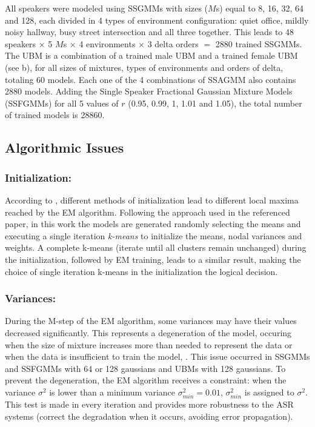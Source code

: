 All speakers were modeled using SSGMMs with sizes ($M$s) equal to 8, 16, 32, 64 and 128, each divided in 4 types of environment configuration: quiet office, mildly noisy hallway, busy street intersection and all three together. This leads to 48 speakers $\times$ 5 $M$s $\times$ 4 environments $\times$ 3 delta orders $=$ 2880 trained SSGMMs. The UBM is a combination of a trained male UBM and a trained female UBM (see b), for all sizes of mixtures, types of environments and orders of delta, totaling 60 models. Each one of the 4 combinations of SSAGMM also contains 2880 models. Adding the Single Speaker Fractional Gaussian Mixture Models (SSFGMMs) for all 5 values of $r$ (0.95, 0.99, 1, 1.01 and 1.05), the total number of trained models is 28860.

\subsection{Algorithmic Issues}

\subsubsection{Initialization:}

According to , different methods of initialization lead to different local maxima reached by the EM algorithm. Following the approach used in the referenced paper, in this work the models are generated randomly selecting the means and executing a single iteration \emph{k-means} to initialize the means, nodal variances and weights. A complete k-means (iterate until all clusters remain unchanged) during the initialization, followed by EM training, leads to a similar result, making the choice of single iteration k-means in the initialization the logical decision.

\subsubsection{Variances:}

During the M-step of the EM algorithm, some variances may have their values decreased significantly. This represents a degeneration of the model, occuring when the size of mixture increases more than needed to represent the data or when the data is insufficient to train the model, . This issue occurred in SSGMMs and SSFGMMs with 64 or 128 gaussians and UBMs with 128 gaussians. To prevent the degeneration, the EM algorithm receives a constraint: when the variance $\sigma^2$ is lower than a minimum variance $\sigma_{min}^2 = 0.01$, $\sigma_{min}^2$ is assigned to $\sigma^2$. This test is made in every iteration and provides more robustness to the ASR systems (correct the degradation when it occurs, avoiding error propagation).

